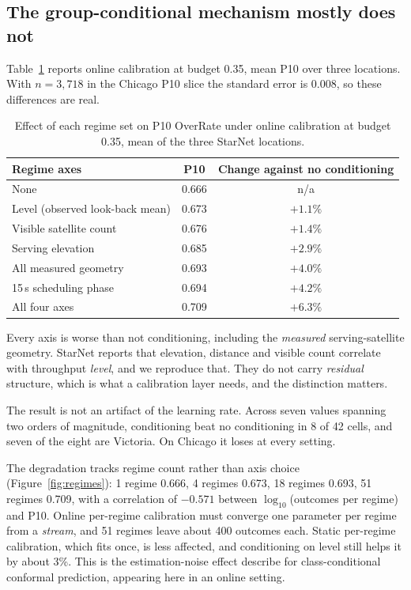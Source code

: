 \documentclass[acmsmall,screen]{acmart}
\begin{document}
\subsection{The group-conditional mechanism mostly does not}
\label{sec:groups}

Table~\ref{tab:axes} reports online calibration at budget 0.35, mean P10 over three locations. With $n = 3{,}718$ in the Chicago P10 slice the standard error is 0.008, so these differences are real.

\begin{table}[t]
\caption{Effect of each regime set on P10 OverRate under online calibration at budget 0.35, mean of the three StarNet locations.}
\label{tab:axes}
\begin{tabular}{lcc}
\toprule
Regime axes & P10 & Change against no conditioning \\
\midrule
None & 0.666 & n/a \\
Level (observed look-back mean) & 0.673 & $+1.1\%$ \\
Visible satellite count & 0.676 & $+1.4\%$ \\
Serving elevation & 0.685 & $+2.9\%$ \\
All measured geometry & 0.693 & $+4.0\%$ \\
15\,s scheduling phase & 0.694 & $+4.2\%$ \\
All four axes & 0.709 & $+6.3\%$ \\
\bottomrule
\end{tabular}
\end{table}

Every axis is worse than not conditioning, including the \emph{measured} serving-satellite geometry. StarNet reports that elevation, distance and visible count correlate with throughput \emph{level}, and we reproduce that. They do not carry \emph{residual} structure, which is what a calibration layer needs, and the distinction matters.

The result is not an artifact of the learning rate. Across seven values spanning two orders of magnitude, conditioning beat no conditioning in 8 of 42 cells, and seven of the eight are Victoria. On Chicago it loses at every setting.

The degradation tracks regime count rather than axis choice (Figure~\ref{fig:regimes}): 1 regime 0.666, 4 regimes 0.673, 18 regimes 0.693, 51 regimes 0.709, with a correlation of $-0.571$ between $\log_{10}$(outcomes per regime) and P10. Online per-regime calibration must converge one parameter per regime from a \emph{stream}, and 51 regimes leave about 400 outcomes each. Static per-regime calibration, which fits once, is less affected, and conditioning on level still helps it by about 3\%. This is the estimation-noise effect \citet{ding2023clustered} describe for class-conditional conformal prediction, appearing here in an online setting.
\end{document}
